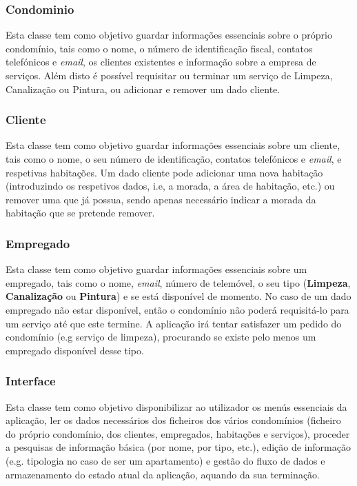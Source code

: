 \documentclass[a4paper]{article}
\begin{document}
\subsubsection{Condominio}

Esta classe tem como objetivo guardar informações essenciais sobre o próprio condomínio, tais como o nome, o número de identificação fiscal, contatos telefónicos e \textit{email}, os clientes existentes e informação sobre a empresa de serviços. Além disto é possível requisitar ou terminar um serviço de Limpeza, Canalização ou Pintura, ou adicionar e remover um dado cliente.

\subsubsection{Cliente}

Esta classe tem como objetivo guardar informações essenciais sobre um cliente, tais como o nome, o seu número de identificação, contatos telefónicos e \textit{email}, e respetivas habitações. Um dado cliente pode adicionar uma nova habitação (introduzindo os respetivos dados, i.e, a morada, a área de habitação, etc.) ou remover uma que já possua, sendo apenas necessário indicar a morada da habitação que se pretende remover.

\subsubsection{Empregado}

Esta classe tem como objetivo guardar informações essenciais sobre um empregado, tais como o nome, \textit{email}, número de telemóvel, o seu tipo (\textbf{Limpeza}, \textbf{Canalização} ou \textbf{Pintura}) e se está disponível de momento. No caso de um dado empregado não estar disponível, então o condomínio não poderá requisitá-lo para um serviço até que este termine. A aplicação irá tentar satisfazer um pedido do condomínio (e.g serviço de limpeza), procurando se existe pelo menos um empregado disponível desse tipo.

\subsubsection{Interface}

Esta classe tem como objetivo disponibilizar ao utilizador os menús essenciais da aplicação, ler os dados necessários dos ficheiros dos vários condomínios (ficheiro do próprio condomínio, dos clientes, empregados, habitações e serviços), proceder a pesquisas de informação básica (por nome, por tipo, etc.), edição de informação (e.g. tipologia no caso de ser um apartamento) e gestão do fluxo de dados e armazenamento do estado atual da aplicação, aquando da sua terminação.
\end{document}
